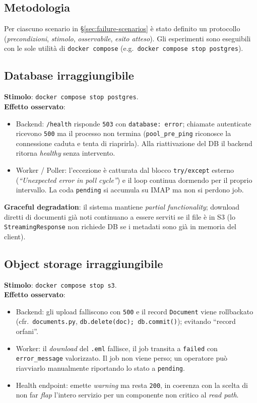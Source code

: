 \documentclass[11pt,a4paper,oneside]{article}
\begin{document}
\subsection{Metodologia}
Per ciascuno scenario in \S\ref{sec:failure-scenarios} \`e stato definito un
protocollo (\emph{precondizioni}, \emph{stimolo}, \emph{osservabile},
\emph{esito atteso}). Gli esperimenti sono eseguibili con le sole utilit\`a
di \texttt{docker compose} (e.g.\ \texttt{docker compose stop postgres}).

\subsection{Database irraggiungibile}
\textbf{Stimolo}: \texttt{docker compose stop postgres}. \\
\textbf{Effetto osservato}:
\begin{itemize}[leftmargin=*]
    \item Backend: \texttt{/health} risponde \texttt{503} con
          \texttt{database: error}; chiamate autenticate ricevono \texttt{500}
          ma il processo non termina (\texttt{pool\_pre\_ping} riconosce la
          connessione caduta e tenta di riaprirla). Alla riattivazione del
          DB il backend ritorna \emph{healthy} senza intervento.
    \item Worker / Poller: l'eccezione \`e catturata dal blocco
          \texttt{try/except} esterno (\emph{``Unexpected error in poll cycle''})
          e il loop continua dormendo per il proprio intervallo. La coda
          \texttt{pending} si accumula su IMAP ma non si perdono job.
\end{itemize}
\textbf{Graceful degradation}: il sistema mantiene \emph{partial
functionality}; download diretti di documenti gi\`a noti continuano a essere
serviti se il file \`e in S3 (lo \texttt{StreamingResponse} non richiede DB se
i metadati sono gi\`a in memoria del client).

\subsection{Object storage irraggiungibile}
\textbf{Stimolo}: \texttt{docker compose stop s3}. \\
\textbf{Effetto osservato}:
\begin{itemize}[leftmargin=*]
    \item Backend: gli upload falliscono con \texttt{500} e il record
          \texttt{Document} viene rollbackato (cfr.\ \texttt{documents.py},
          \texttt{db.delete(doc); db.commit()}); evitando ``record orfani''.
    \item Worker: il \emph{download} del \texttt{.eml} fallisce, il job
          transita a \texttt{failed} con \texttt{error\_message} valorizzato.
          Il job non viene perso; un operatore pu\`o riavviarlo manualmente
          riportando lo stato a \texttt{pending}.
    \item Health endpoint: emette \emph{warning} ma resta \texttt{200}, in
          coerenza con la scelta di non far \emph{flap} l'intero servizio per
          un componente non critico al \emph{read path}.
\end{itemize}
\end{document}
